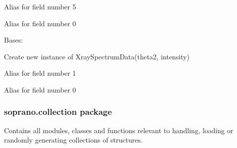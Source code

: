 \documentclass[letterpaper,10pt,english]{sphinxmanual}
\begin{document}
\begin{fulllineitems}
\begin{fulllineitems}
\label{doctree/soprano.calculate.xrd.xrd:soprano.calculate.xrd.xrd.XraySpectrum.lambdax}
Alias for field number 5

\end{fulllineitems}


\begin{fulllineitems}
\label{doctree/soprano.calculate.xrd.xrd:soprano.calculate.xrd.xrd.XraySpectrum.theta2}
Alias for field number 0

\end{fulllineitems}


\end{fulllineitems}


\begin{fulllineitems}
\label{doctree/soprano.calculate.xrd.xrd:soprano.calculate.xrd.xrd.XraySpectrumData}
Bases: 

Create new instance of XraySpectrumData(theta2, intensity)

\begin{fulllineitems}
\label{doctree/soprano.calculate.xrd.xrd:soprano.calculate.xrd.xrd.XraySpectrumData.intensity}
Alias for field number 1

\end{fulllineitems}


\begin{fulllineitems}
\label{doctree/soprano.calculate.xrd.xrd:soprano.calculate.xrd.xrd.XraySpectrumData.theta2}
Alias for field number 0

\end{fulllineitems}


\end{fulllineitems}



\subsubsection{soprano.collection package}
\label{doctree/soprano.collection:soprano-collection-package}\label{doctree/soprano.collection::doc}\label{doctree/soprano.collection:module-soprano.collection}
Contains all modules, classes and functions relevant
to handling, loading or randomly generating
collections of structures.
\end{document}
